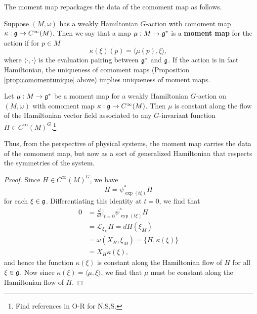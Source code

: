 \documentclass{amsart}
\begin{document}
The moment map repackages the data of the comoment map as follows.
\begin{definition}
    Suppose $(M,\omega)$ has a weakly Hamiltonian $G$-action with comoment map $\kappa:\mathfrak g\to C^\infty(M)$.
    Then we say that a map $\mu:M\to \mathfrak g^*$ is a \textbf{moment map} for the action if for $p\in M$
    \begin{equation*}
        \kappa(\xi)(p) = \langle \mu(p), \xi\rangle,
    \end{equation*}
    where $\langle\cdot,\cdot\rangle$ is the evaluation pairing between $\mathfrak g^*$ and $\mathfrak g$.
    If the action is in fact Hamiltonian, the uniqueness of comoment maps (Proposition \ref{prop:comomentunique} above)
    implies uniqueness of moment maps.
\end{definition}

\begin{theorem}
    Let $\mu:M\to\mathfrak g^*$ be a moment map for a weakly Hamiltonian $G$-action on $(M,\omega)$
    with comoment map $\kappa:\mathfrak g\to C^\infty(M)$.
    Then $\mu$ is constant along the flow of the Hamiltonian vector field associated to any
    $G$-invariant function $H\in C^\infty(M)^G$.\footnote{Find references in O-R for N,S,S.}
\end{theorem}

Thus, from the perspective of physical systems, the moment map carries the data of
the comoment map, but now as a sort of generalized Hamiltonian that respects the symmetries
of the system.

\begin{proof}
    Since $H\in C^\infty(M)^G$, we have
    \begin{equation*}
        H=\psi_{\exp(t\xi)}^*H
    \end{equation*}
    for each $\xi\in\mathfrak g$. Differentiating this identity at $t=0$, we find that
    \begin{align*}
        0 &= \frac{d}{dt}\bigg|_{t=0} \psi_{\exp(t\xi)}^*H\\
        &= \mathcal{L}_{\xi_M}H=dH(\xi_M)\\
        &= \omega(X_H,\xi_M)=\{H,\kappa(\xi)\}\\
        &= X_H\kappa(\xi),
    \end{align*}
    and hence the function $\kappa(\xi)$ is constant along the Hamiltonian flow of $H$ for all
    $\xi\in\mathfrak g$.  Now since $\kappa(\xi) = \langle \mu, \xi\rangle$, we find that $\mu$ must be
    constant along the Hamiltonian flow of $H$.
\end{proof}
\end{document}
